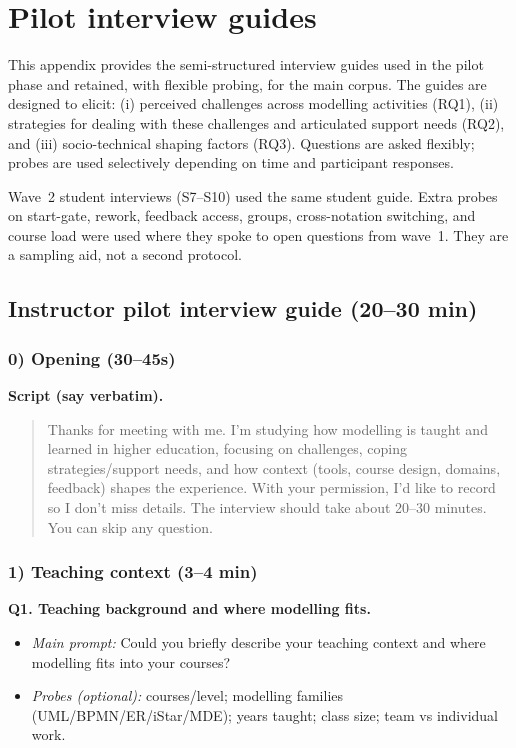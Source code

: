 \chapter{Pilot interview guides}
\label{app:interview_guides}

This appendix provides the semi-structured interview guides used in the pilot phase and retained, with flexible probing, for the main corpus. The guides are designed to elicit: (i) perceived challenges across modelling activities (RQ1), (ii) strategies for dealing with these challenges and articulated support needs (RQ2), and (iii) socio-technical shaping factors (RQ3). Questions are asked flexibly; probes are used selectively depending on time and participant responses.

Wave~2 student interviews (S7--S10) used the same student guide. Extra probes on start-gate, rework, feedback access, groups, cross-notation switching, and course load were used where they spoke to open questions from wave~1. They are a sampling aid, not a second protocol.

\section{Instructor pilot interview guide (20--30 min)}
\label{app:guide_instructor}

\subsection*{0) Opening (30--45s)}
\textbf{Script (say verbatim).}
\begin{quote}
Thanks for meeting with me. I’m studying how modelling is taught and learned in higher education, focusing on challenges, coping strategies/support needs, and how context (tools, course design, domains, feedback) shapes the experience. With your permission, I’d like to record so I don’t miss details. The interview should take about 20--30 minutes. You can skip any question.
\end{quote}

\subsection*{1) Teaching context (3--4 min)}
\textbf{Q1. Teaching background and where modelling fits.}
\begin{itemize}
  \item \emph{Main prompt:} Could you briefly describe your teaching context and where modelling fits into your courses?
  \item \emph{Probes (optional):} courses/level; modelling families (UML/BPMN/ER/iStar/MDE); years taught; class size; team vs individual work.
\end{itemize}

